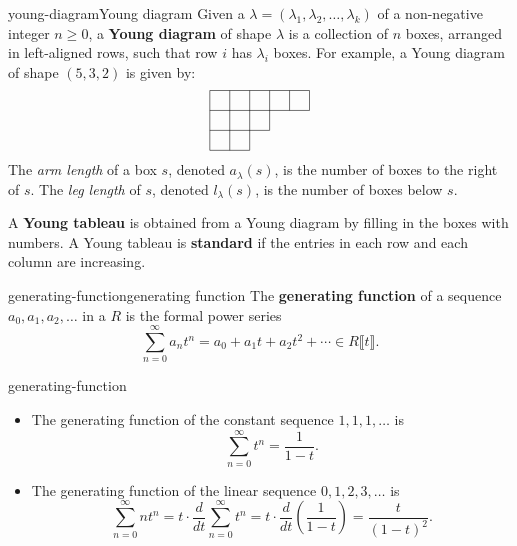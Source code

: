 \begin{topic}{young-diagram}{Young diagram}
    Given a  $\lambda = (\lambda_1, \lambda_2, \ldots, \lambda_k)$ of a non-negative integer $n \ge 0$, a \textbf{Young diagram} of shape $\lambda$ is a collection of $n$ boxes, arranged in left-aligned rows, such that row $i$ has $\lambda_i$ boxes. For example, a Young diagram of shape $(5, 3, 2)$ is given by:
    \[ \begin{tikzpicture}
        \begin{scope}[scale=0.5]
            \draw (0, 3) -- (5, 3); \draw (0, 2) -- (5, 2); \draw (0, 1) -- (3, 1); \draw (0, 0) -- (2, 0); \draw (0, 3) -- (0, 0); \draw (1, 3) -- (1, 0); \draw (2, 3) -- (2, 0); \draw (3, 3) -- (3, 1); \draw (4, 3) -- (4, 2); \draw (5, 3) -- (5, 2);
        \end{scope}
    \end{tikzpicture} \]
    The \textit{arm length} of a box $s$, denoted $a_\lambda(s)$, is the number of boxes to the right of $s$. The \textit{leg length} of $s$, denoted $l_\lambda(s)$, is the number of boxes below $s$.
    
    A \textbf{Young tableau} is obtained from a Young diagram by filling in the boxes with numbers. A Young tableau is \textbf{standard} if the entries in each row and each column are increasing.
\end{topic}

\begin{topic}{generating-function}{generating function}
    The \textbf{generating function} of a sequence $a_0, a_1, a_2, \ldots$ in a  $R$ is the formal power series
    \[ \sum_{n = 0}^{\infty} a_n t^n = a_0 + a_1 t + a_2 t^2 + \cdots \in R \llbracket t \rrbracket . \]
\end{topic}

\begin{example}{generating-function}
    \begin{itemize}
        \item The generating function of the constant sequence $1, 1, 1, \ldots$ is
        \[ \sum_{n = 0}^{\infty} t^n = \frac{1}{1 - t} . \]
        \item The generating function of the linear sequence $0, 1, 2, 3, \ldots$ is
        \[ \sum_{n = 0}^{\infty} n t^{n} = t \cdot \frac{d}{dt} \sum_{n = 0}^{\infty} t^{n} = t \cdot \frac{d}{dt} \left( \frac{1}{1 - t} \right) = \frac{t}{(1 - t)^2} . \]
    \end{itemize}
\end{example}

